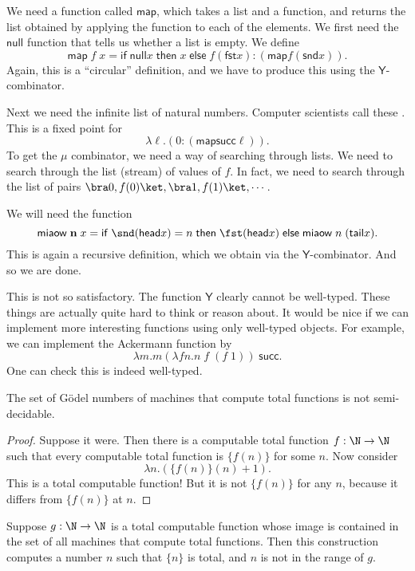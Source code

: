 \documentclass[a4paper]{article}
\newcommand\head{\mathsf{head}}
\newcommand\tail{\mathsf{tail}}
\renewcommand\succ{\mathsf{succ}}
\newcommand\cif{\mathsf{if}\;}
\newcommand\cthen{\;\mathsf{then}\;}
\newcommand\celse{\;\mathsf{else}\;}
\newcommand\cfst{\mathsf{fst}}
\newcommand\csnd{\mathsf{snd}}
\newcommand\cmap{\mathsf{map}}
\newcommand\cnull{\mathsf{null}}
\newcommand\Yc{\mathsf{Y}}
\newcommand\meow{\mathsf{miaow}}
\begin{document}
We need a function called $\cmap$, which takes a list and a function, and returns the list obtained by applying the function to each of the elements. We first need the $\cnull$ function that tells us whether a list is empty. We define
\[ %
  \cmap\; f\; x = \cif \cnull x\cthen x \celse f(\cfst x):(\cmap f (\csnd x)).
\]
Again, this is a ``circular'' definition, and we have to produce this using the $\Yc$-combinator.

Next we need the infinite list of natural numbers. Computer scientists call these . This is a fixed point for
\[
  \lambda \ell. (0:(\cmap \succ \ell)).
\]
To get the $\mu$ combinator,  we need a way of searching through lists. We need to search through the list (stream) of values of $f$. In fact, we need to search through the list of pairs $\bra 0, f(0)\ket, \bra 1, f(1)\ket, \cdots$.

We will need the function
\[
  \meow\; \mathbf{n}\; x = \cif \snd (\head x) = n \cthen \fst (\head x) \celse \meow\; n\; (\tail x).
\]
This is again a recursive definition, which we obtain via the $\Yc$-combinator. And so we are done.

This is not so satisfactory. The function $\Yc$ clearly cannot be well-typed. These things are actually quite hard to think or reason about. It would be nice if we can implement more interesting functions using only well-typed objects. For example, we can implement the Ackermann function by
\[
  \lambda m. m ( \lambda f n. n\; f\; (f\; 1))\; \succ.
\]
One can check this is indeed well-typed.


\begin{thm}
  The set of G\"odel numbers of machines that compute total functions is not semi-decidable.
\end{thm}

\begin{proof}
  Suppose it were. Then there is a computable total function $f: \N \to \N$ such that every computable total function is $\{f(n)\}$ for some $n$. Now consider
  \[
    \lambda n. (\{f(n)\} (n) + 1).
  \]
  This is a total computable function! But it is not $\{f(n)\}$ for any $n$, because it differs from $\{f(n)\}$ at $n$.
\end{proof}

Suppose $g: \N \to \N$ is a total computable function whose image is contained in the set of all machines that compute total functions. Then this construction computes a number $n$ such that $\{n\}$ is total, and $n$ is not in the range of $g$.
\end{document}
